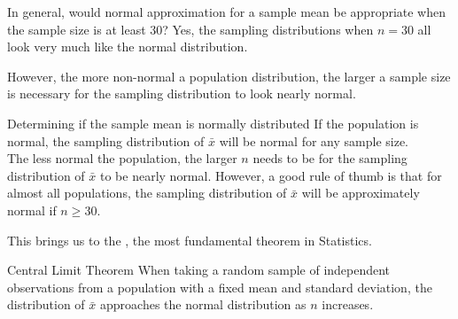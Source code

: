 \begin{examplewrap}
\begin{nexample}{In general, would normal approximation for a sample mean be appropriate when the sample size is at least 30?}
Yes, the sampling distributions when $n = 30$ all look very much like the normal distribution.

However, the more non-normal a population distribution, the larger a sample size is necessary for the sampling distribution to look nearly normal.
\end{nexample}
\end{examplewrap}

\begin{onebox}{Determining if the sample mean is normally distributed}
If the population is normal, the sampling distribution of $\bar{x}$ will be normal for any sample size. \\[2mm]
The less normal the population, the larger $n$ needs to be for the sampling distribution of $\bar{x}$ to be nearly normal. However, a good rule of thumb is that for almost all populations, the sampling distribution of $\bar{x}$ will be approximately normal if $n \ge 30$.\end{onebox}

This brings us to the , the most fundamental theorem in Statistics.

\begin{onebox}{Central Limit Theorem}
When taking a random sample of independent observations from a population with a fixed mean and standard deviation, the distribution of $\bar{x}$ approaches the normal distribution as $n$ increases.\end{onebox}

\D{\newpage}

